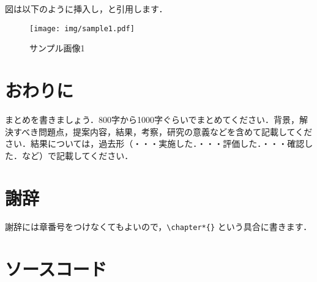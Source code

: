 \documentclass[a4paper,11pt,uplatex]{ujreport}
\begin{document}
図は以下のように挿入し，と引用します．\par

\begin{figure}[!tb]
  \centering
  \texttt{[image: img/sample1.pdf]}
  \caption{サンプル画像1}
  \label{fig:sample1}
\end{figure}

\chapter{おわりに}
\label{sec:Conclusion}

まとめを書きましょう．800字から1000字ぐらいでまとめてください．背景，解決すべき問題点，提案内容，結果，考察，研究の意義などを含めて記載してください．結果については，過去形（・・・実施した．・・・評価した．・・・確認した．など）で記載してください．\par

\clearpage

\chapter*{謝辞}
\label{sec:Acknowledgments}

謝辞には章番号をつけなくてもよいので，\verb|\chapter*{}| という具合に書きます．

\clearpage

\appendix
\chapter{ソースコード}
\label{apndx:src}
\end{document}
